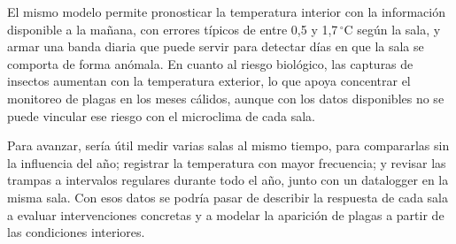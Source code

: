 \documentclass[11pt,a4paper]{article}
\begin{document}
El mismo modelo permite pronosticar la temperatura interior con la información disponible a la mañana, con errores típicos de entre 0{,}5 y 1{,}7\,$^\circ$C según la sala, y armar una banda diaria que puede servir para detectar días en que la sala se comporta de forma anómala. En cuanto al riesgo biológico, las capturas de insectos aumentan con la temperatura exterior, lo que apoya concentrar el monitoreo de plagas en los meses cálidos, aunque con los datos disponibles no se puede vincular ese riesgo con el microclima de cada sala.

Para avanzar, sería útil medir varias salas al mismo tiempo, para compararlas sin la influencia del año; registrar la temperatura con mayor frecuencia; y revisar las trampas a intervalos regulares durante todo el año, junto con un datalogger en la misma sala. Con esos datos se podría pasar de describir la respuesta de cada sala a evaluar intervenciones concretas y a modelar la aparición de plagas a partir de las condiciones interiores.
\end{document}
